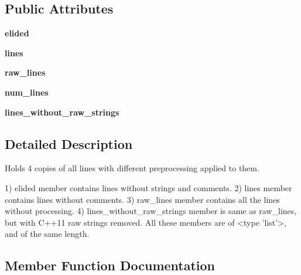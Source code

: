 \subsection*{Public Attributes}
\begin{DoxyCompactItemize}
\item 
{\bfseries elided}\hypertarget{classcpplint_1_1CleansedLines_aa4d0a4d5081675c01656a5d86d99e8bd}{}\label{classcpplint_1_1CleansedLines_aa4d0a4d5081675c01656a5d86d99e8bd}

\item 
{\bfseries lines}\hypertarget{classcpplint_1_1CleansedLines_a9cd74bd010da1610a46322d6821bd06a}{}\label{classcpplint_1_1CleansedLines_a9cd74bd010da1610a46322d6821bd06a}

\item 
{\bfseries raw\+\_\+lines}\hypertarget{classcpplint_1_1CleansedLines_a9e94ce9e4f682be33c04fe82429c4dfd}{}\label{classcpplint_1_1CleansedLines_a9e94ce9e4f682be33c04fe82429c4dfd}

\item 
{\bfseries num\+\_\+lines}\hypertarget{classcpplint_1_1CleansedLines_a4b42ab48659954fb6e0a4e4eb483a45a}{}\label{classcpplint_1_1CleansedLines_a4b42ab48659954fb6e0a4e4eb483a45a}

\item 
{\bfseries lines\+\_\+without\+\_\+raw\+\_\+strings}\hypertarget{classcpplint_1_1CleansedLines_a0cc228ba3c00ba590b27a759cf8023ce}{}\label{classcpplint_1_1CleansedLines_a0cc228ba3c00ba590b27a759cf8023ce}

\end{DoxyCompactItemize}


\subsection{Detailed Description}
\begin{DoxyVerb}Holds 4 copies of all lines with different preprocessing applied to them.

1) elided member contains lines without strings and comments.
2) lines member contains lines without comments.
3) raw_lines member contains all the lines without processing.
4) lines_without_raw_strings member is same as raw_lines, but with C++11 raw
   strings removed.
All these members are of <type 'list'>, and of the same length.
\end{DoxyVerb}
 

\subsection{Member Function Documentation}
